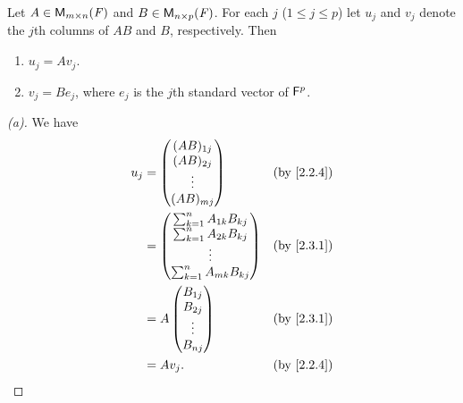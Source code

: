 \begin{thm}\label{2.13}
	Let \(A \in \ms\) and \(B \in \ms[n][p][\F]\).
	For each \(j\) (\(1 \leq j \leq p\)) let \(u_j\) and \(v_j\) denote the \(j\)th columns of \(AB\) and \(B\), respectively.
	Then
	\begin{enumerate}
		\item \(u_j = A v_j\).
		\item \(v_j = B e_j\), where \(e_j\) is the \(j\)th standard vector of \(\mathsf{F}^p\).
	\end{enumerate}
\end{thm}

\begin{proof}[(a)]
	We have
	\begin{align*}
		u_j & = \begin{pmatrix}
			        (AB)_{1 j} \\
			        (AB)_{2 j} \\
			        \vdots     \\
			        (AB)_{m j}
		        \end{pmatrix}                 &  & \by{2.2.4}   \\
		    & = \begin{pmatrix}
			        \sum_{k = 1}^n A_{1 k} B_{k j} \\
			        \sum_{k = 1}^n A_{2 k} B_{k j} \\
			        \vdots                         \\
			        \sum_{k = 1}^n A_{m k} B_{k j}
		        \end{pmatrix} &  & \by{2.3.1}                  \\
		    & = A \begin{pmatrix}
			          B_{1 j} \\
			          B_{2 j} \\
			          \vdots  \\
			          B_{n j}
		          \end{pmatrix}               &  & \by{2.3.1}   \\
		    & = A v_j.                          &  & \by{2.2.4}
	\end{align*}
\end{proof}

